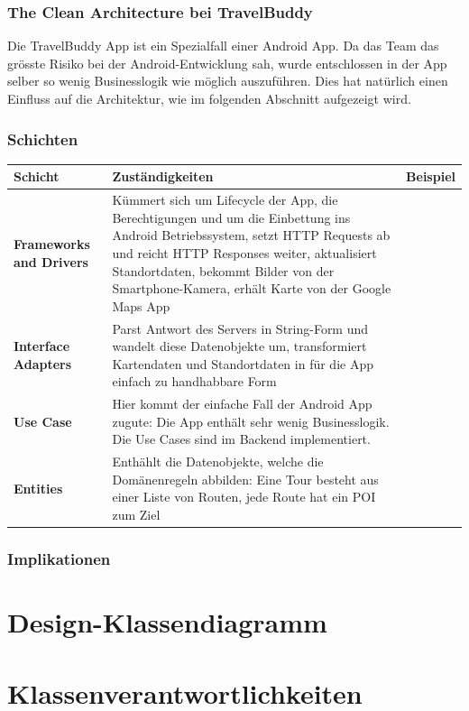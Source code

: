 \documentclass[a4paper,10pt,xetex]{article}
\begin{document}
\subsubsection{The Clean Architecture bei TravelBuddy}
Die TravelBuddy App ist ein Spezialfall einer Android App. Da das Team das grösste Risiko bei der Android-Entwicklung sah, wurde entschlossen in der App selber so wenig Businesslogik wie möglich auszuführen. 
Dies hat natürlich einen Einfluss auf die Architektur, wie im folgenden Abschnitt aufgezeigt wird.


\subsubsection{Schichten}\label{layerstravelbuddy}
\begin{longtabu} to \textwidth { | l | X[l] |  }
\hline
\textbf{Schicht} & \textbf{Zuständigkeiten} & \textbf{Beispiel} \\\hline
\endhead
\textbf{Frameworks and Drivers} & Kümmert sich um Lifecycle der App, die Berechtigungen und um die Einbettung ins Android Betriebssystem, setzt HTTP Requests ab und reicht HTTP Responses weiter, aktualisiert Standortdaten, bekommt Bilder von der Smartphone-Kamera, erhält Karte von der Google Maps App\\\hline
\textbf{Interface Adapters} & Parst Antwort des Servers in String-Form und wandelt diese Datenobjekte um, transformiert Kartendaten und Standortdaten in für die App einfach zu handhabbare Form\\\hline
\textbf{Use Case} & Hier kommt der einfache Fall der Android App zugute: Die App enthält sehr wenig Businesslogik. Die Use Cases sind im Backend implementiert.\\\hline
\textbf{Entities} & Enthählt die Datenobjekte, welche die Domänenregeln abbilden: Eine Tour besteht aus einer Liste von Routen, jede Route hat ein POI zum Ziel\\\hline
\end{longtabu}

\subsubsection{Implikationen}\label{implications}

\section{Design-Klassendiagramm}\label{design-klassendiagram}
\section{Klassenverantwortlichkeiten}\label{klassenverantwortlichkeiten}
\end{document}
